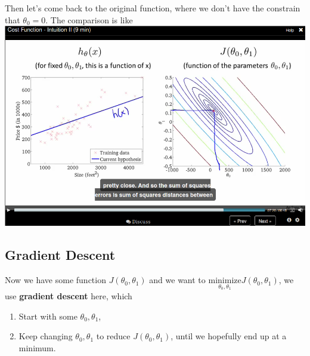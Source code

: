 \documentclass[11pt]{article}
\begin{document}
Then let's come back to the original function, where we don't have the constrain that \(\theta_0 = 0\). The comparison is like
\includegraphics[width=.9\linewidth]{./images/screenshot-06.png}
\subsection*{Gradient Descent}
\label{sec-3-4}
Now we have some function \(J(\theta_0,\theta_1)\) and we want to \(\underset{\theta_0,\theta_1}{\text{minimize}}J(\theta_0,\theta_1)\), we use \textbf{gradient descent} here, which
\begin{enumerate}
\item Start with some \(\theta_0,\theta_1\),
\item Keep changing \(\theta_0,\theta_1\) to reduce \(J(\theta_0,\theta_1)\), until we hopefully end up at a minimum.
\end{enumerate}
\end{document}
